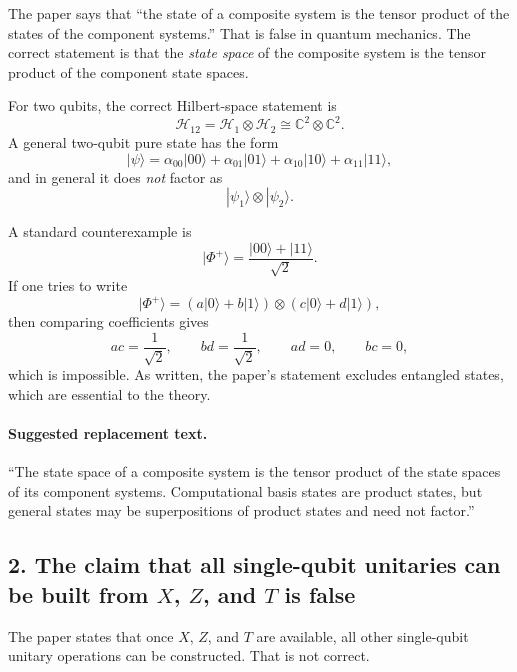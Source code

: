 \documentclass[11pt]{article}
\begin{document}
The paper says that ``the state of a composite system is the tensor product of the states of the component systems.'' That is false in quantum mechanics. The correct statement is that the \emph{state space} of the composite system is the tensor product of the component state spaces.

For two qubits, the correct Hilbert-space statement is
\[
\mathcal H_{12}=\mathcal H_1\otimes \mathcal H_2 \cong \mathbb C^2 \otimes \mathbb C^2.
\]
A general two-qubit pure state has the form
\[
|\psi\rangle=\alpha_{00}|00\rangle+\alpha_{01}|01\rangle+\alpha_{10}|10\rangle+\alpha_{11}|11\rangle,
\]
and in general it does \emph{not} factor as
\[
|\psi_1\rangle \otimes |\psi_2\rangle.
\]

A standard counterexample is
\[
|\Phi^+\rangle=\frac{|00\rangle+|11\rangle}{\sqrt2}.
\]
If one tries to write
\[
|\Phi^+\rangle=(a|0\rangle+b|1\rangle)\otimes(c|0\rangle+d|1\rangle),
\]
then comparing coefficients gives
\[
ac=\frac{1}{\sqrt2}, \qquad bd=\frac{1}{\sqrt2}, \qquad ad=0, \qquad bc=0,
\]
which is impossible. As written, the paper's statement excludes entangled states, which are essential to the theory.

\paragraph{Suggested replacement text.}
``The state space of a composite system is the tensor product of the state spaces of its component systems. Computational basis states are product states, but general states may be superpositions of product states and need not factor.''

\subsection*{2. The claim that all single-qubit unitaries can be built from \(X\), \(Z\), and \(T\) is false}

The paper states that once \(X\), \(Z\), and \(T\) are available, all other single-qubit unitary operations can be constructed. That is not correct.
\end{document}
